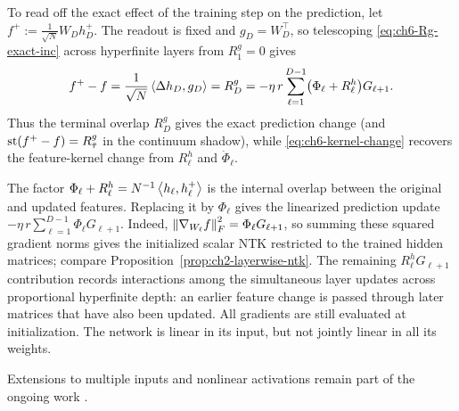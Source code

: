 To read off the exact effect of the training step on the prediction, let $f^+ := \frac{1}{\sqrt{N}} W_D h_D^+$. The readout is fixed and $g_D = W_D^\top$, so telescoping \eqref{eq:ch6-Rg-exact-inc} across hyperfinite layers from $R_1^g = 0$ gives
\begin{equation}
\label{eq:ch6-pred-change}
f^+ - f = \frac{1}{\sqrt{N}}\left\langle \Delta h_D, g_D \right\rangle = R_D^g
= -\eta\,r \sum_{\ell=1}^{D-1} \bigl(\Phi_\ell + R_\ell^h\bigr) G_{\ell+1}.
\end{equation}
Thus the terminal overlap $R_D^g$ gives the exact prediction change (and $\operatorname{st}(f^+ - f) = R_{\bar{\tau}}^g$ in the continuum shadow), while \eqref{eq:ch6-kernel-change} recovers the feature-kernel change from $R_\ell^h$ and $\dot{\Phi}_\ell$.

The factor $\Phi_\ell + R_\ell^h = N^{-1}\left\langle h_\ell, h_\ell^+ \right\rangle$ is the internal overlap between the original and updated features. Replacing it by $\Phi_\ell$ gives the linearized prediction update $-\eta\,r \sum_{\ell=1}^{D-1} \Phi_\ell G_{\ell+1}$. Indeed, $\left\lVert \nabla_{W_\ell} f \right\rVert_F^2 = \Phi_\ell G_{\ell+1}$, so summing these squared gradient norms gives the initialized scalar NTK restricted to the trained hidden matrices; compare Proposition~\ref{prop:ch2-layerwise-ntk}.
The remaining $R_\ell^h G_{\ell+1}$ contribution records interactions among the simultaneous layer updates across proportional hyperfinite depth: an earlier feature change is passed through later matrices that have also been updated. All gradients are still evaluated at initialization. The network is linear in its input, but not jointly linear in all its weights.

Extensions to multiple inputs and nonlinear activations remain part of the ongoing work \cite{li2026feature}.
